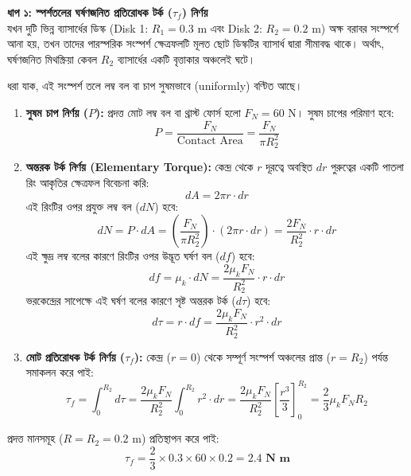 \documentclass[12pt, a4paper]{article}
\begin{document}
\begin{tcolorbox}[solutionbox={সমাধান (Solution)}]
\noindent
\textbf{ধাপ ১: স্পর্শতলের ঘর্ষণজনিত প্রতিরোধক টর্ক ($\tau_f$) নির্ণয়} \\
যখন দুটি ভিন্ন ব্যাসার্ধের ডিস্ক (Disk 1: $R_1 = 0.3\text{ m}$ এবং Disk 2: $R_2 = 0.2\text{ m}$) অক্ষ বরাবর সংস্পর্শে আনা হয়, তখন তাদের পারস্পরিক সংস্পর্শ ক্ষেত্রফলটি মূলত ছোট ডিস্কটির ব্যাসার্ধ দ্বারা সীমাবদ্ধ থাকে। অর্থাৎ, ঘর্ষণজনিত মিথস্ক্রিয়া কেবল $R_2$ ব্যাসার্ধের একটি বৃত্তাকার অঞ্চলেই ঘটে।

ধরা যাক, এই সংস্পর্শ তলে লম্ব বল বা চাপ সুষমভাবে (uniformly) বণ্টিত আছে। 
\begin{enumerate}[leftmargin=*, parsep=0.3ex]
    \item \textbf{সুষম চাপ নির্ণয় ($P$):} প্রদত্ত মোট লম্ব বল বা থ্রাস্ট ফোর্স হলো $F_N = 60\text{ N}$। সুষম চাপের পরিমাণ হবে:
    \[ P = \frac{F_N}{\text{Contact Area}} = \frac{F_N}{\pi R_2^2} \]
    
    \item \textbf{অন্তরক টর্ক নির্ণয় (Elementary Torque):} কেন্দ্র থেকে $r$ দূরত্বে অবস্থিত $dr$ পুরুত্বের একটি পাতলা রিং আকৃতির ক্ষেত্রফল বিবেচনা করি:
    \[ dA = 2\pi r \cdot dr \]
    এই রিংটির ওপর প্রযুক্ত লম্ব বল ($dN$) হবে:
    \[ dN = P \cdot dA = \left( \frac{F_N}{\pi R_2^2} \right) \cdot (2\pi r \cdot dr) = \frac{2 F_N}{R_2^2} \cdot r \cdot dr \]
    এই ক্ষুদ্র লম্ব বলের কারণে রিংটির ওপর উদ্ভূত ঘর্ষণ বল ($df$) হবে:
    \[ df = \mu_k \cdot dN = \frac{2 \mu_k F_N}{R_2^2} \cdot r \cdot dr \]
    ভরকেন্দ্রের সাপেক্ষে এই ঘর্ষণ বলের কারণে সৃষ্ট অন্তরক টর্ক ($d\tau$) হবে:
    \[ d\tau = r \cdot df = \frac{2 \mu_k F_N}{R_2^2} \cdot r^2 \cdot dr \]

    \item \textbf{মোট প্রতিরোধক টর্ক নির্ণয় ($\tau_f$):} কেন্দ্র ($r = 0$) থেকে সম্পূর্ণ সংস্পর্শ অঞ্চলের প্রান্ত ($r = R_2$) পর্যন্ত সমাকলন করে পাই:
    \[ \tau_f = \int_{0}^{R_2} d\tau = \frac{2 \mu_k F_N}{R_2^2} \int_{0}^{R_2} r^2 \cdot dr = \frac{2 \mu_k F_N}{R_2^2} \left[ \frac{r^3}{3} \right]_{0}^{R_2} = \frac{2}{3} \mu_k F_N R_2 \]
\end{enumerate}

প্রদত্ত মানসমূহ ($R = R_2 = 0.2\text{ m}$) প্রতিস্থাপন করে পাই:
\[ \tau_f = \frac{2}{3} \times 0.3 \times 60 \times 0.2 = \mathbf{2.4\text{ N m}} \]

\vspace{1em}
\begin{center}
\begin{tikzpicture}[>=Stealth, scale=1.4, text=black]
    

\end{tikzpicture}
\end{center}
\end{tcolorbox}
\end{document}
